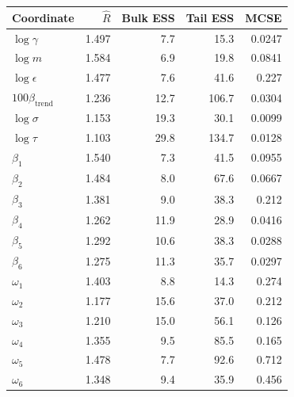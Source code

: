\begin{tabular}{lrrrr}
\toprule
Coordinate & $\widehat R$ & Bulk ESS & Tail ESS & MCSE \\
\midrule
$\log\gamma$ & 1.497 & 7.7 & 15.3 & 0.0247 \\
$\log m$ & 1.584 & 6.9 & 19.8 & 0.0841 \\
$\log\epsilon$ & 1.477 & 7.6 & 41.6 & 0.227 \\
$100\beta_{\mathrm{trend}}$ & 1.236 & 12.7 & 106.7 & 0.0304 \\
$\log\sigma$ & 1.153 & 19.3 & 30.1 & 0.0099 \\
$\log\tau$ & 1.103 & 29.8 & 134.7 & 0.0128 \\
$\beta_1$ & 1.540 & 7.3 & 41.5 & 0.0955 \\
$\beta_2$ & 1.484 & 8.0 & 67.6 & 0.0667 \\
$\beta_3$ & 1.381 & 9.0 & 38.3 & 0.212 \\
$\beta_4$ & 1.262 & 11.9 & 28.9 & 0.0416 \\
$\beta_5$ & 1.292 & 10.6 & 38.3 & 0.0288 \\
$\beta_6$ & 1.275 & 11.3 & 35.7 & 0.0297 \\
$\omega_1$ & 1.403 & 8.8 & 14.3 & 0.274 \\
$\omega_2$ & 1.177 & 15.6 & 37.0 & 0.212 \\
$\omega_3$ & 1.210 & 15.0 & 56.1 & 0.126 \\
$\omega_4$ & 1.355 & 9.5 & 85.5 & 0.165 \\
$\omega_5$ & 1.478 & 7.7 & 92.6 & 0.712 \\
$\omega_6$ & 1.348 & 9.4 & 35.9 & 0.456 \\
\bottomrule
\end{tabular}
